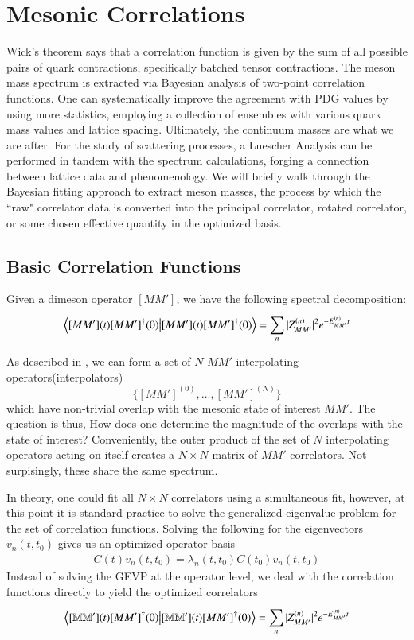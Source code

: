 
\chapter{Mesonic Correlations}
\label{sec:signal}
Wick's theorem says that a correlation function is given by the sum of all possible pairs of quark contractions, specifically batched tensor contractions. \cite{Chen:2023zyy}
The meson mass spectrum is extracted via Bayesian analysis of two-point correlation functions. One can systematically improve the agreement with PDG values by using more statistics, employing a collection of ensembles with various quark mass values and lattice spacing. Ultimately, the continuum masses are what we are after. For the study of scattering processes, a Luescher Analysis can be performed in tandem with the spectrum calculations, forging a connection between lattice data and phenomenology. We will briefly walk through the Bayesian fitting approach to extract meson masses, the process by which the ``raw" correlator data is converted into the principal correlator, rotated correlator, or some chosen effective quantity in the optimized basis. 

\section{Basic Correlation Functions}
Given a dimeson operator $[MM']$, we have the following spectral decomposition: 
\begin{align}
    \braket{[MM'](t) [MM']^\dagger(0)} = \sum_{n}^{} |Z_{MM'}^{(n)}|^2 e^{-E_{MM'}^{(n)}t}
\end{align}

As described in , we can form a set of $N$ $MM'$ interpolating operators(interpolators) $$\{[MM']^{(0)},\dots,[MM']^{(N)}\}$$ which have non-trivial overlap with the mesonic state of interest $MM'$. The question is thus, How does one determine the magnitude of the overlaps with the state of interest? Conveniently, the outer product of the set of $N$ interpolating operators acting on itself creates a $N \times N$ matrix of $MM'$ correlators. Not surpisingly, these share the same spectrum. 

In theory, one could fit all $N \times N$ correlators using a simultaneous fit, however, at this point it is standard practice to solve the generalized eigenvalue problem for the set of correlation functions. Solving the following for the eigenvectors $v_n(t,t_0)$ gives us an optimized operator basis
\begin{align}
    C(t)v_n(t,t_0) = \lambda_n(t,t_0)C(t_0)v_n(t,t_0)
\end{align}
Instead of solving the GEVP at the operator level, we deal with the correlation functions directly to yield the optimized correlators 
\begin{align}
    \braket{[\mathbb{MM'}](t) [MM']^\dagger(0)} = \sum_{n}^{} |Z_{MM'}^{(n)}|^2 e^{-E_{MM'}^{(n)}t} 
\end{align}


